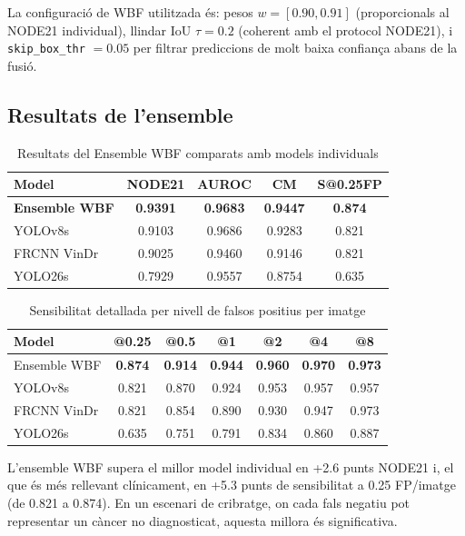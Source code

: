 La configuració de WBF utilitzada és: pesos $w = [0.90, 0.91]$ (proporcionals al NODE21 individual), llindar IoU $\tau = 0.2$ (coherent amb el protocol NODE21), i \texttt{skip\_box\_thr} $= 0.05$ per filtrar prediccions de molt baixa confiança abans de la fusió.

\subsection{Resultats de l'ensemble}

\begin{table}[H]
\centering
\caption{Resultats del Ensemble WBF comparats amb models individuals}
\label{tab:ensemble}
\begin{tabular}{lcccc}
\toprule
\textbf{Model} & \textbf{NODE21} & \textbf{AUROC} & \textbf{CM} & \textbf{S@0.25FP} \\
\midrule
\textbf{Ensemble WBF} & \textbf{0.9391} & \textbf{0.9683} & \textbf{0.9447} & \textbf{0.874} \\
YOLOv8s & 0.9103 & 0.9686 & 0.9283 & 0.821 \\
FRCNN VinDr & 0.9025 & 0.9460 & 0.9146 & 0.821 \\
YOLO26s & 0.7929 & 0.9557 & 0.8754 & 0.635 \\
\bottomrule
\end{tabular}
\end{table}

\begin{table}[H]
\centering
\caption{Sensibilitat detallada per nivell de falsos positius per imatge}
\label{tab:sensitivity}
\begin{tabular}{lcccccc}
\toprule
\textbf{Model} & \textbf{@0.25} & \textbf{@0.5} & \textbf{@1} & \textbf{@2} & \textbf{@4} & \textbf{@8} \\
\midrule
Ensemble WBF & \textbf{0.874} & \textbf{0.914} & \textbf{0.944} & \textbf{0.960} & \textbf{0.970} & \textbf{0.973} \\
YOLOv8s & 0.821 & 0.870 & 0.924 & 0.953 & 0.957 & 0.957 \\
FRCNN VinDr & 0.821 & 0.854 & 0.890 & 0.930 & 0.947 & 0.973 \\
YOLO26s & 0.635 & 0.751 & 0.791 & 0.834 & 0.860 & 0.887 \\
\bottomrule
\end{tabular}
\end{table}

L'ensemble WBF supera el millor model individual en +2.6 punts NODE21 i, el que és més rellevant clínicament, en +5.3 punts de sensibilitat a 0.25 FP/imatge (de 0.821 a 0.874). En un escenari de cribratge, on cada fals negatiu pot representar un càncer no diagnosticat, aquesta millora és significativa.

